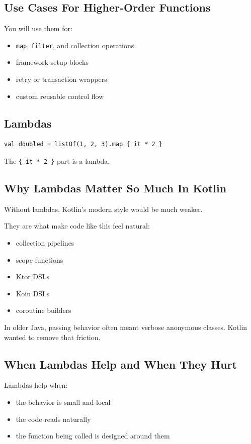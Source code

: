 \documentclass[11pt,a4paper]{article}
\begin{document}
\subsection{Use Cases For Higher-Order Functions}

You will use them for:
\begin{itemize}
    \item \texttt{map}, \texttt{filter}, and collection operations
    \item framework setup blocks
    \item retry or transaction wrappers
    \item custom reusable control flow
\end{itemize}

\subsection{Lambdas}

\begin{lstlisting}[style=kazekotlin]
val doubled = listOf(1, 2, 3).map { it * 2 }
\end{lstlisting}

The \texttt{\{ it * 2 \}} part is a lambda.

\subsection{Why Lambdas Matter So Much In Kotlin}

Without lambdas, Kotlin's modern style would be much weaker.

They are what make code like this feel natural:
\begin{itemize}
    \item collection pipelines
    \item scope functions
    \item Ktor DSLs
    \item Koin DSLs
    \item coroutine builders
\end{itemize}

In older Java, passing behavior often meant verbose anonymous classes. Kotlin wanted to remove that friction.

\subsection{When Lambdas Help and When They Hurt}

Lambdas help when:
\begin{itemize}
    \item the behavior is small and local
    \item the code reads naturally
    \item the function being called is designed around them
\end{itemize}
\end{document}
